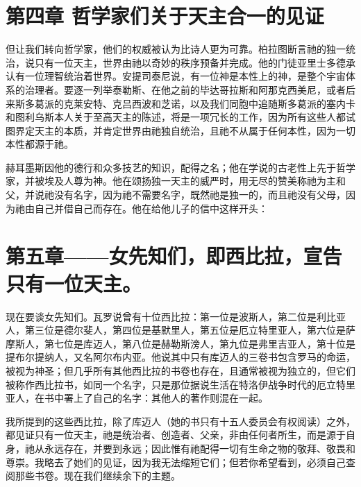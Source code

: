 
\section{第四章 哲学家们关于天主合一的见证}

但让我们转向哲学家，他们的权威被认为比诗人更为可靠。柏拉图断言祂的独一统治，说只有一位天主，世界由祂以奇妙的秩序预备并完成。他的门徒亚里士多德承认有一位理智统治着世界。安提司泰尼说，有一位神是本性上的神，是整个宇宙体系的治理者。要逐一列举泰勒斯、在他之前的毕达哥拉斯和阿那克西美尼，或者后来斯多葛派的克莱安特、克吕西波和芝诺，以及我们同胞中追随斯多葛派的塞内卡和图利乌斯本人关于至高天主的陈述，将是一项冗长的工作，因为所有这些人都试图界定天主的本质，并肯定世界由祂独自统治，且祂不从属于任何本性，因为一切本性都源于祂。\par

赫耳墨斯因他的德行和众多技艺的知识，配得之名；他在学说的古老性上先于哲学家，并被埃及人尊为神。他在颂扬独一天主的威严时，用无尽的赞美称祂为主和父，并说祂没有名字，因为祂不需要名字，既然祂是独一的，而且祂没有父母，因为祂由自己并借自己而存在。他在给他儿子的信中这样开头：\par


\section{第五章——女先知们，即西比拉，宣告只有一位天主。}

现在要谈女先知们。瓦罗说曾有十位西比拉：第一位是波斯人，第二位是利比亚人，第三位是德尔斐人，第四位是基默里人，第五位是厄立特里亚人，第六位是萨摩斯人，第七位是库迈人，第八位是赫勒斯滂人，第九位是弗里吉亚人，第十位是提布尔提纳人，又名阿尔布内亚。他说其中只有库迈人的三卷书包含罗马的命运，被视为神圣；但几乎所有其他西比拉的书卷也存在，且通常被视为独立的，但它们被称作西比拉书，如同一个名字，只是那位据说生活在特洛伊战争时代的厄立特里亚人，在书中署上了自己的名字：其他人的著作则混在一起。\par

我所提到的这些西比拉，除了库迈人（她的书只有十五人委员会有权阅读）之外，都见证只有一位天主，祂是统治者、创造者、父亲，非由任何者所生，而是源于自身，祂从永远存在，并要到永远；因此惟有祂配得一切有生命之物的敬拜、敬畏和尊崇。我略去了她们的见证，因为我无法缩短它们；但若你希望看到，必须自己查阅那些书卷。现在我们继续余下的主题。\par


